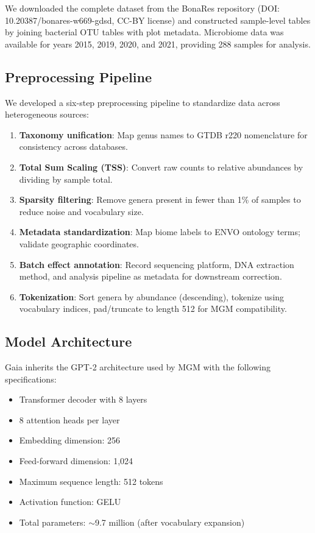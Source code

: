 \documentclass[11pt,a4paper]{article}
\begin{document}
We downloaded the complete dataset from the BonaRes repository (DOI: 10.20387/bonares-w669-gdsd, CC-BY license) and constructed sample-level tables by joining bacterial OTU tables with plot metadata. Microbiome data was available for years 2015, 2019, 2020, and 2021, providing 288 samples for analysis.

\subsection{Preprocessing Pipeline}

We developed a six-step preprocessing pipeline to standardize data across heterogeneous sources:

\begin{enumerate}[leftmargin=1.5em]
    \item \textbf{Taxonomy unification}: Map genus names to GTDB r220 nomenclature for consistency across databases.
    \item \textbf{Total Sum Scaling (TSS)}: Convert raw counts to relative abundances by dividing by sample total.
    \item \textbf{Sparsity filtering}: Remove genera present in fewer than 1\% of samples to reduce noise and vocabulary size.
    \item \textbf{Metadata standardization}: Map biome labels to ENVO ontology terms; validate geographic coordinates.
    \item \textbf{Batch effect annotation}: Record sequencing platform, DNA extraction method, and analysis pipeline as metadata for downstream correction.
    \item \textbf{Tokenization}: Sort genera by abundance (descending), tokenize using vocabulary indices, pad/truncate to length 512 for MGM compatibility.
\end{enumerate}

\subsection{Model Architecture}

Gaia inherits the GPT-2 architecture used by MGM with the following specifications:

\begin{itemize}[leftmargin=1.5em]
    \item Transformer decoder with 8 layers
    \item 8 attention heads per layer
    \item Embedding dimension: 256
    \item Feed-forward dimension: 1,024
    \item Maximum sequence length: 512 tokens
    \item Activation function: GELU
    \item Total parameters: $\sim$9.7 million (after vocabulary expansion)
\end{itemize}
\end{document}
